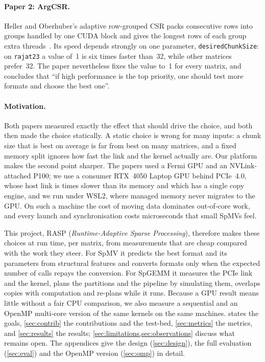 \paragraph{Paper 2: ArgCSR.} Heller and Oberhuber's adaptive row-grouped CSR packs consecutive rows into
groups handled by one CUDA block and gives the longest rows of each group extra threads~\cite{heller2012argcsr}. Its
speed depends strongly on one parameter, \texttt{desiredChunkSize}: on \texttt{rajat23} a value of~1 is six times
faster than~32, while other matrices prefer~32. The paper nevertheless fixes the value to~1 for every matrix, and
concludes that ``if high performance is the top priority, one should test more formats and choose the best one''.

\paragraph{Motivation.} Both papers measured exactly the effect that should drive the choice, and both then made the
choice statically. A static choice is wrong for many inputs: a chunk size that is best on average is far from best on
many matrices, and a fixed memory split ignores how fast the link and the kernel actually are. Our platform makes the
second point sharper. The papers used a Fermi GPU and an NVLink-attached P100; we use a consumer RTX~4050 Laptop GPU
behind PCIe~4.0, whose host link is  times slower than its memory and which has a single copy
engine, and we run under WSL2, where managed memory never migrates to the GPU. On such a machine the cost of moving
data dominates out-of-core work, and every launch and synchronisation costs microseconds that small SpMVs feel.

This project, RASP (\emph{Runtime-Adaptive Sparse Processing}), therefore makes these choices at run time, per
matrix, from measurements that are cheap compared with the work they steer. For SpMV it predicts the best format
and its parameters from structural features and converts formats only when the expected number of calls repays the
conversion. For SpGEMM it measures the PCIe link and the kernel, plans the partitions and the pipeline by simulating
them, overlaps copies with computation and re-plans while it runs. Because a GPU result means little without a fair
CPU comparison, we also measure a sequential and an OpenMP multi-core version of the same kernels on the same
machines.  states the goals, \cref{sec:contrib} the contributions and the test-bed,
\cref{sec:metrics} the metrics, and \cref{sec:results} the results; \cref{sec:limitations,sec:observations} discuss
what remains open. The appendices give the design (\cref{sec:design}), the full evaluation (\cref{sec:eval}) and the
OpenMP version (\cref{sec:omp}) in detail.
